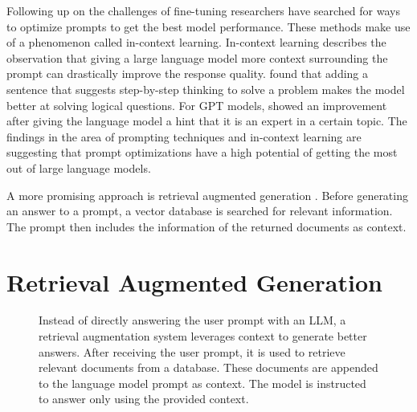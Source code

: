 \documentclass[../main.tex]{subfiles}
\begin{document}
Following up on the challenges of fine-tuning researchers have searched for ways to optimize prompts to get the best model performance.
These methods make use of a phenomenon called in-context learning.
In-context learning describes the observation that giving a large language model more context surrounding the prompt can drastically improve the response quality.
\cite{Wei2022} found that adding a sentence that suggests step-by-step thinking to solve a problem makes the model better at solving logical questions.
For GPT models, \autocite{Xu2023} showed an improvement after giving the language model a hint that it is an expert in a certain topic.
The findings in the area of prompting techniques and in-context learning are suggesting
that prompt optimizations have a high potential of getting the most out of large language models.

A more promising approach is retrieval augmented generation \cite{Lewis2020}.
Before generating an answer to a prompt, a vector database is searched for relevant information.
The prompt then includes the information of the returned documents as context.

\section{Retrieval Augmented Generation}

\begin{figure}[t]
      \centering
      \caption{Instead of directly answering the user prompt with an LLM,
            a retrieval augmentation system leverages context to generate better answers.
            After receiving the user prompt, it is used to retrieve relevant documents from a database.
            These documents are appended to the language model prompt as context.
            The model is instructed to answer only using the provided context.}
      \label{fig:rag_flowchart}
\end{figure}
\end{document}
